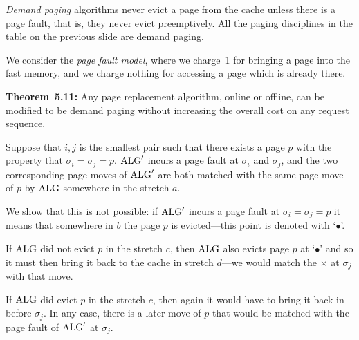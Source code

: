 \begin{frame}

{\em Demand paging} algorithms never evict a page from the cache
unless there is a page fault, that is, they never evict preemptively.
All the paging disciplines in the table on the previous slide are
demand paging.  

We consider the {\em page fault model}, where we charge~1 for bringing
a page into the fast memory, and we charge nothing for accessing a
page which is already there. 

{\bf Theorem~5.11:} Any page replacement algorithm, online or offline,
can be modified to be demand paging without increasing the overall
cost on any request sequence.
\end{frame}

\begin{frame}
\begin{center}
\begin{minipage}{8cm}
\end{minipage}
\end{center}
\end{frame}

\begin{frame}
Suppose that $i,j$ is the smallest pair such that there
exists a page $p$ with the property that $\sigma_i=\sigma_j=p$.
$\mathrm{ALG}'$ incurs a page fault at $\sigma_i$ and $\sigma_j$, and the two
corresponding page moves of $\mathrm{ALG}'$ are both matched with the same
page move of $p$ by $\mathrm{ALG}$ somewhere in the stretch $a$.  

We show that
this is not possible: if $\mathrm{ALG}'$ incurs a page fault at
$\sigma_i=\sigma_j=p$ it means that somewhere in $b$
the page $p$ is evicted---this point is denoted with
`$\bullet$'.  

If $\mathrm{ALG}$ did not evict $p$ in the stretch $c$, then
$\mathrm{ALG}$ also evicts page $p$ at `$\bullet$' and so it must then bring it
back to the cache in stretch $d$---we would match the $\times$ at
$\sigma_j$ with that move.  

If $\mathrm{ALG}$ did evict $p$ in the stretch
$c$, then again it would have to bring it back in before $\sigma_j$.
In any case, there is a later move of $p$ that would be matched with
the page fault of $\mathrm{ALG}'$ at $\sigma_j$.
\end{frame}

